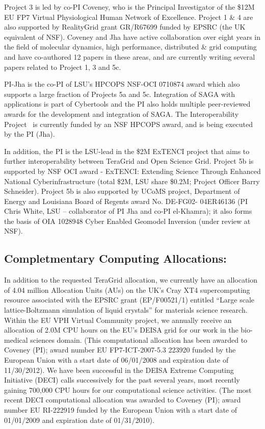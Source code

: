 \documentclass[a4paper,10pt]{article}
\begin{document}
Project 3 is led by co-PI Coveney, who is the Principal Investigator of the \$12M EU FP7 Virtual Physiological Human Network of Excellence. Project 1 \& 4 are also supported by RealityGrid grant GR/R67699 funded by EPSRC (the UK equivalent of NSF). Coveney and Jha have active collaboration over eight years in the field of molecular dynamics, high performance, distributed \& grid computing and have co-authored 12 papers in these areas, and are currently writing several papers related to Project 1, 3 and 5c.
 
PI-Jha is the co-PI of LSU's HPCOPS NSF-OCI 0710874 award which also supports a large fraction of Projects 5a and 5c. Integration of SAGA with applications is part of Cybertools and the PI also holds multiple peer-reviewed awards for the development and integration of SAGA.  The Interoperability Project~\cite{interop_url} is currently funded by an NSF HPCOPS award, and is being executed by the PI (Jha).

In addition, the PI is the LSU-lead in the \$2M ExTENCI project that aims to further interoperability between TeraGrid and Open Science Grid.  Project 5b is supported by NSF OCI award - ExTENCI: Extending Science Through Enhanced National Cyberinfrastructure (total \$2M, LSU share \$0.2M; Project Officer Barry Schneider).  Project 5b is also supported by UCoMS project, Department of Energy and Louisiana Board of Regents award No. DE-FG02- 04ER46136 (PI Chris White, LSU -- collaborator of PI Jha and co-PI el-Khamra); it also forms the basis of OIA 1028948 Cyber Enabled Geomodel Inversion (under review at NSF).

\subsection{Completmentary Computing Allocations:} In addition to the requested TeraGrid allocation, we currently have an allocation of 4.04 million Allocation Units (AUs) on the UK's Cray XT4 supercomputing resource associated with the EPSRC grant (EP/F00521/1) entitled ``Large scale lattice-Boltzmann simulation of liquid crystals'' for materials science research. Within the EU VPH Virtual Community project, we annually receive an allocation of 2.0M CPU hours on the EU's DEISA grid for our work in the bio-medical sciences domain.  (This computational allocation has been awarded to Coveney (PI); award number EU FP7-ICT-2007-5.3 223920 funded by the European Union with a start date of 06/01/2008 and expiration date of 11/30/2012).  We have been successful in the DEISA Extreme Computing Initiative (DECI) calls successively for the past several years, most recently gaining 700,000 CPU hours for our computational science activities.  (The most recent DECI computational allocation was awarded to Coveney (PI); award number EU RI-222919 funded by the European Union with a start date of 01/01/2009 and expiration date of 01/31/2010).
\end{document}
